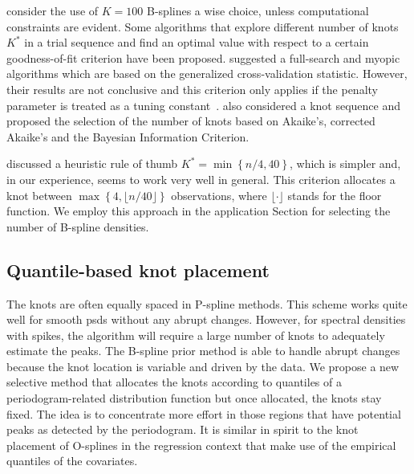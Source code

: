 \documentclass[twocolumn,final]{svjour3}
\begin{document}
\cite{Eilers2015} consider the use of $K=100$ B-splines a wise choice, unless computational constraints are evident.  Some algorithms that explore different number of knots $K^*$ in a trial sequence and find an optimal value with respect to a certain goodness-of-fit criterion have been proposed. \cite{Ruppert2002} suggested a full-search and myopic algorithms which are based on the generalized cross-validation statistic.  However, their results are not conclusive and this criterion only applies if the penalty parameter is treated as a tuning constant~\citep{Kauermann2011}.  \cite{Likhachev2017} also considered a knot sequence and proposed the selection of the number of knots based on  Akaike's, corrected Akaike's and
the Bayesian Information Criterion.

\cite{Ruppert2002} discussed a heuristic rule of thumb $K^* = \min\left\{n/4, 40\right\}$, which is simpler and, in our experience, seems to work very well in general.  This criterion allocates a knot between $\max\left\{ 4, \lfloor n/40 \rfloor \right\}$ observations, where $\lfloor \cdot \rfloor$ stands for the floor function.  We employ this approach in the application Section for selecting the number of B-spline densities.


\subsection*{Quantile-based knot placement}

The knots are often equally spaced in P-spline methods.  This scheme works quite well  for smooth psds without any abrupt changes.  However, for spectral densities with spikes, the algorithm will require a large number of knots to adequately estimate the peaks.  The B-spline prior method is able to handle abrupt changes because the knot location is variable and  driven by the data.  We propose a new selective method that allocates the knots according to quantiles of a periodogram-related distribution function but once allocated, the knots stay fixed.  The idea is to concentrate more effort in those regions that have potential peaks as detected by the periodogram.  It is similar in spirit to the knot placement of O-splines \citep{WandOrmerod} in the regression context that make use of the empirical quantiles of the covariates. 
\end{document}
